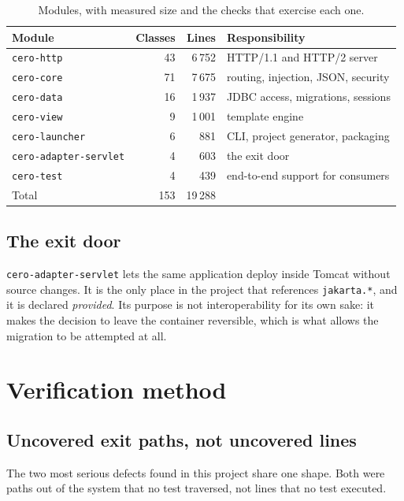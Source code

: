 \documentclass[preprint,12pt]{elsarticle}
\begin{document}
\begin{table}[ht]
\centering
\caption{Modules, with measured size and the checks that exercise each one.}
\label{tab:modules}
\begin{tabular}{lrrl}
\toprule
Module & Classes & Lines & Responsibility \\
\midrule
\texttt{cero-http}    &  43 &  6\,752 & HTTP/1.1 and HTTP/2 server \\
\texttt{cero-core}    &  71 &  7\,675 & routing, injection, JSON, security \\
\texttt{cero-data}    &  16 &  1\,937 & JDBC access, migrations, sessions \\
\texttt{cero-view}    &   9 &  1\,001 & template engine \\
\texttt{cero-launcher} &  6 &     881 & CLI, project generator, packaging \\
\texttt{cero-adapter-servlet} & 4 & 603 & the exit door \\
\texttt{cero-test}    &   4 &     439 & end-to-end support for consumers \\
\midrule
Total                 & 153 & 19\,288 & \\
\bottomrule
\end{tabular}
\end{table}

\subsection{The exit door}

\texttt{cero-adapter-servlet} lets the same application deploy inside Tomcat
without source changes. It is the only place in the project that references
\texttt{jakarta.*}, and it is declared \emph{provided}. Its purpose is not
interoperability for its own sake: it makes the decision to leave the container
reversible, which is what allows the migration to be attempted at all.

\section{Verification method}
\label{sec:method}

\subsection{Uncovered exit paths, not uncovered lines}

The two most serious defects found in this project share one shape. Both were
paths out of the system that no test traversed, not lines that no test executed.
\end{document}
